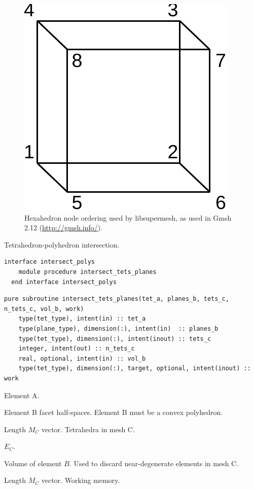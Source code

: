 \documentclass{article}
\begin{document}
\begin{figure}\begin{centering}
  \includegraphics[height=0.25\textwidth]{doc/hex_ordering}
  \caption{Hexahedron node ordering used by libsupermesh, as used in
           Gmsh 2.12 (\url{http://gmsh.info/}).}\label{fig:hex_ordering}
\end{centering}\end{figure}

\noindent Tetrahedron-polyhedron intersection.

\begin{lstlisting}[language=FORTRAN]
  interface intersect_polys
    module procedure intersect_tets_planes
  end interface intersect_polys
\end{lstlisting}
  
\begin{lstlisting}[language=FORTRAN]
  pure subroutine intersect_tets_planes(tet_a, planes_b, tets_c, n_tets_c, vol_b, work)
    type(tet_type), intent(in) :: tet_a
    type(plane_type), dimension(:), intent(in)  :: planes_b
    type(tet_type), dimension(:), intent(inout) :: tets_c
    integer, intent(out) :: n_tets_c
    real, optional, intent(in) :: vol_b
    type(tet_type), dimension(:), target, optional, intent(inout) :: work
\end{lstlisting}

\begin{description}[font=\ttfamily\bfseries,leftmargin=2.2\parindent,labelindent=1.7\parindent,noitemsep]
  \item[tet\_a] Element A.
  \item[planes\_b] Element B facet half-spaces. Element B must be a convex
    polyhedron.
  \item[tets\_c] Length $M_C$ vector. Tetrahedra in mesh C.
  \item[n\_tets\_c] $E_C$.
  \item[vol\_b] Volume of element $B$. Used to discard near-degenerate elements
    in mesh C.
  \item[work] Length $M_C$ vector. Working memory.
\end{description}
\end{document}
